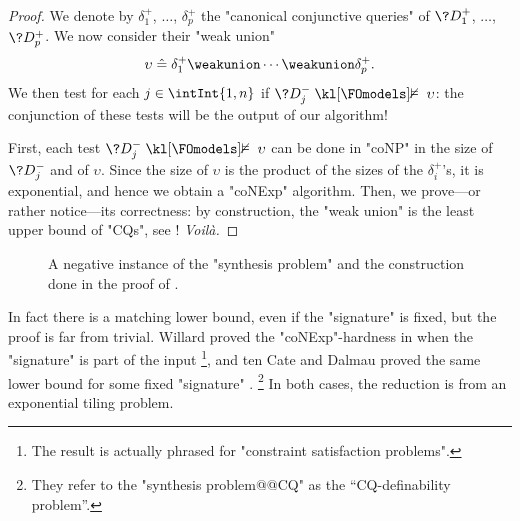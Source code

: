 \begin{proof}
	We denote by $\delta^+_1$, $\dotsc$, $\delta^+_p$ the "canonical conjunctive queries"
	of $\?D^+_1$, $\dotsc$, $\?D^+_p$.
	We now consider their "weak union"
	\[
		\upsilon \defeq \delta^+_1 \weakunion \cdots \weakunion \delta^+_p.
	\]
	We then test for each $j\in \intInt{1,n}$ if 
	$\?D^-_j \notFOmodels \upsilon$: the conjunction of these tests will be
	the output of our algorithm!
	
	First, each test $\?D^-_j \notFOmodels \upsilon$
	can be done in "coNP" in the size of $\?D^-_j$ and of
	$\upsilon$. Since the size of $\upsilon$ is the product of
	the sizes of the $\delta^+_i$'s, it is exponential,
	and hence we obtain a "coNExp" algorithm.
	Then, we prove---or rather notice---its correctness: by construction,
	the "weak union" is the least upper bound of "CQs",
	see ! \emph{Voilà.}
\end{proof}
\begin{figure}
	\centering
	\caption{
		\AP\label{fig:ex-synthesis-cq-negative}
		A negative instance of the "synthesis problem" and the construction
		done in the proof of .
	}
\end{figure}

In fact there is a matching lower bound, even if the "signature" is fixed,
but the  proof is far from trivial.
Willard proved the "coNExp"-hardness in
\cite[Theorem~3]{Willard2010Testing} when the "signature" is part of the input%
\footnote{The result is actually phrased for "constraint satisfaction problems".},
and ten Cate and Dalmau proved the same lower bound
for some fixed "signature" \cite[Theorem~2]{tenCateDalmau2015Product}.%
\footnote{They refer to the "synthesis problem@@CQ" as the ``CQ-definability problem''.}
In both cases, the reduction is from an exponential tiling problem.

